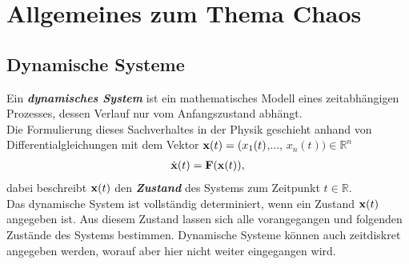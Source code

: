 

\section{Allgemeines zum Thema Chaos}
\label{sec:allgemeines}

\subsection{Dynamische Systeme}
\label{sub:dynamSys}
Ein \textit{\textbf{dynamisches System}} ist ein mathematisches Modell eines zeitabhängigen Prozesses, dessen Verlauf nur vom Anfangszustand abhängt. \citep{WikiDynSys}\\ 
Die Formulierung dieses Sachverhaltes in der Physik geschieht anhand von Differentialgleichungen mit dem Vektor $\vect{x}(t)=(x_1(t)$,..., $x_n(t))\in\mathbb{R}^n$
\begin{gather}
    \dot{\vect{x}}(t)=\vect{F}(\vect{x}(t)),
    \label{eq:dynamDGL}
\end{gather}
dabei beschreibt $\vect{x}(t)$ den \textit{\textbf{Zustand}} des Systems zum Zeitpunkt $t\in\mathbb{R}$.\\
Das dynamische System ist vollständig determiniert, wenn ein Zustand $\vect{x}(t)$ angegeben ist. Aus diesem Zustand lassen sich alle vorangegangen und folgenden Zustände des Systems bestimmen. Dynamische Systeme können auch zeitdiskret angegeben werden, worauf aber hier nicht weiter eingegangen wird. \citep{Lueck}\\

